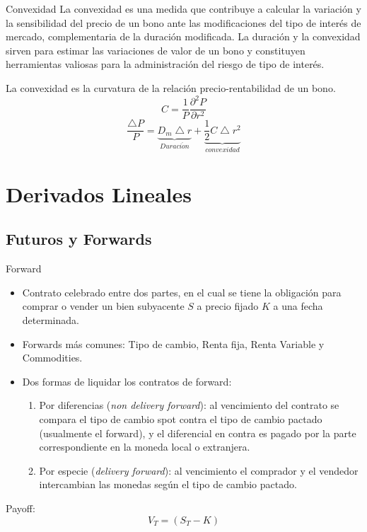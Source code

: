 \documentclass[11pt]{beamer}
\begin{document}
\begin{frame}{Convexidad}
La convexidad es una medida que contribuye a calcular la variación y la sensibilidad del precio de un bono ante las modificaciones del tipo de interés de mercado, complementaria de la duración modificada. La duración y la convexidad sirven para estimar las variaciones de valor de un bono y constituyen herramientas valiosas para la administración del riesgo de tipo de interés.

La convexidad es la curvatura de la relación precio-rentabilidad de un bono. 
\begin{equation}
C=\frac{1}{P}  \frac{\partial^2 P}{\partial r^2}
\end{equation}
\begin{equation}
\frac{ \bigtriangleup P}{P} =
\underbrace{ D_m \bigtriangleup r }_{ Duraci \acute{o} n } +
\underbrace{ \frac{1}{2}  C \bigtriangleup r^2 }_{convexidad}
\end{equation}


\end{frame}

\section{Derivados Lineales}
\subsection{Futuros y Forwards}
\begin{frame}{Forward}
	\begin{itemize}
		\item Contrato celebrado entre dos partes, en el cual se tiene la obligación para comprar o vender un bien subyacente $S$ a precio fijado $K$ a una fecha determinada.
		
		\item Forwards más comunes: Tipo de cambio, Renta fija, Renta Variable y Commodities.
		
		\item Dos formas de liquidar los contratos de forward:
		\begin{enumerate}
			\item Por diferencias (\textit{non delivery forward}): al vencimiento del contrato se compara el tipo de cambio spot contra el tipo de cambio pactado (usualmente el forward), y el diferencial en contra es pagado por la parte correspondiente en la moneda local o extranjera.
			\item Por especie (\textit{delivery forward}): al vencimiento el comprador y el vendedor intercambian las monedas según el tipo de cambio pactado.
			
		\end{enumerate}
		
	\end{itemize}
	
	Payoff:
	\begin{equation}\label{fwd:payodd}
	V_T=(S_T-K)
	\end{equation}
\end{frame}
\end{document}
